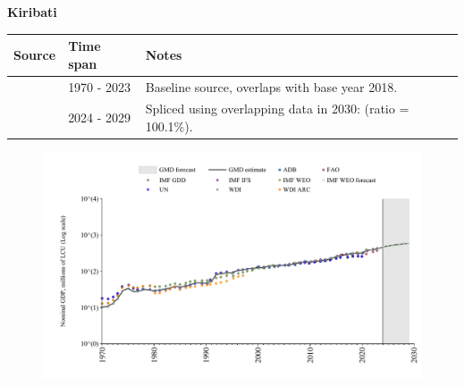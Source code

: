 \documentclass[12pt,a4paper,landscape]{article}
\begin{document}
\begin{adjustbox}{max totalsize={\paperwidth}{\paperheight},center}
\begin{minipage}[t][\textheight][t]{\textwidth}
\vspace*{0.5cm}
{}
\begin{center}
{\Large\bfseries Kiribati}
\end{center}
\vspace{0.5cm}
\begin{table}[H]
\centering
\small
\begin{tabular}{|l|l|l|}
\hline
\textbf{Source} & \textbf{Time span} & \textbf{Notes} \\
\hline
\rowcolor{white}\cite{WDI}& 1970 - 2023 &Baseline source, overlaps with base year 2018.\\
\rowcolor{lightgray}\cite{IMF_WEO_forecast}& 2024 - 2029 &Spliced using overlapping data in 2030: (ratio = 100.1\%).\\
\hline
\end{tabular}
\end{table}
\begin{figure}[H]
\centering
\includegraphics[width=\textwidth,height=0.6\textheight,keepaspectratio]{graphs/KIR_nGDP.pdf}
\end{figure}
\end{minipage}
\end{adjustbox}
\end{document}
